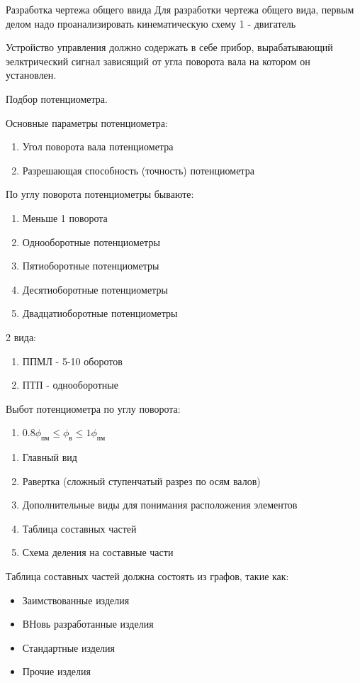\documentclass{article}
\begin{document}
Разработка чертежа общего ввида
Для разработки чертежа общего вида, первым делом надо проанализировать кинематическую схему
1 - двигатель

Устройство управления должно содержать в себе прибор, вырабатывающий эелктрический сигнал зависящий от угла поворота вала на котором он установлен.

Подбор потенциометра.

Основные параметры потенциометра:
\begin{enumerate}
	\item Угол поворота вала потенциометра
	\item Разрешающая способность (точность) потенциометра
\end{enumerate}
По углу поворота потенциометры бываюте:
\begin{enumerate}
	\item Меньше 1 поворота
	\item Однооборотные потенциометры
	\item Пятиоборотные потенциометры
	\item Десятиоборотные потенциометры
	\item Двадцатиоборотные потенциометры
\end{enumerate}

2 вида:
\begin{enumerate}
	\item ППМЛ - 5-10 оборотов
	\item ПТП - однооборотные
\end{enumerate}

Выбот потенциометра по углу поворота:
\begin{enumerate}
	\item $0.8 \phi_{пм} \le \phi_{в} \le 1 \phi_{пм}$
\end{enumerate}

\begin{enumerate}
	\item Главный вид
	\item Равертка (сложный ступенчатый разрез по осям валов)
	\item Дополнительные виды для понимания расположения элементов
	\item Таблица составных частей
	\item Схема деления на составные части
\end{enumerate}

Таблица составных частей должна состоять из графов, такие как:
\begin{itemize}
	\item Заимствованные изделия
	\item ВНовь разработанные изделия
	\item Стандартные изделия
	\item Прочие изделия
\end{itemize}
\end{document}
